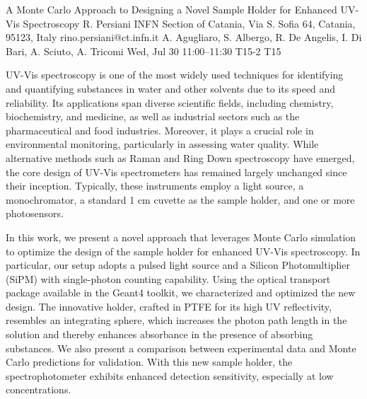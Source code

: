 \begin{talk}
  {A Monte Carlo Approach to Designing a Novel Sample Holder for Enhanced UV-Vis Spectroscopy}%
  {R. Persiani}%
  {INFN Section of Catania, Via S. Sofia 64, Catania, 95123, Italy}%
  {rino.persiani@ct.infn.it}%
  {A. Agugliaro, S. Albergo, R. De Angelis, I. Di Bari, A. Sciuto, A. Tricomi}%
  {}%
  {Wed, Jul 30 11:00--11:30}%
  {T15-2}%
  {T15}%
  
    
   
UV-Vis spectroscopy is one of the most widely used techniques for identifying and quantifying substances in water and other solvents due to its speed and reliability. Its applications span diverse scientific fields, including chemistry, biochemistry, and medicine, as well as industrial sectors such as the pharmaceutical and food industries. Moreover, it plays a crucial role in environmental monitoring, particularly in assessing water quality. While alternative methods such as Raman and Ring Down spectroscopy have emerged, the core design of UV-Vis spectrometers has remained largely unchanged since their inception. Typically, these instruments employ a light source, a monochromator, a standard 1 cm cuvette as the sample holder, and one or more photosensors.

In this work, we present a novel approach that leverages Monte Carlo simulation to optimize the design of the sample holder for enhanced UV-Vis spectroscopy. In particular, our setup adopts a pulsed light source and a Silicon Photomultiplier (SiPM) with single-photon counting capability. Using the optical transport package available in the Geant4 toolkit, we characterized and optimized the new design. The innovative holder, crafted in PTFE for its high UV reflectivity, resembles an integrating sphere, which increases the photon path length in the solution and thereby enhances absorbance in the presence of absorbing substances. We also present a comparison between experimental data and Monte Carlo predictions for validation. With this new sample holder, the spectrophotometer exhibits enhanced detection sensitivity, especially at low concentrations.

\medskip

\end{talk}

